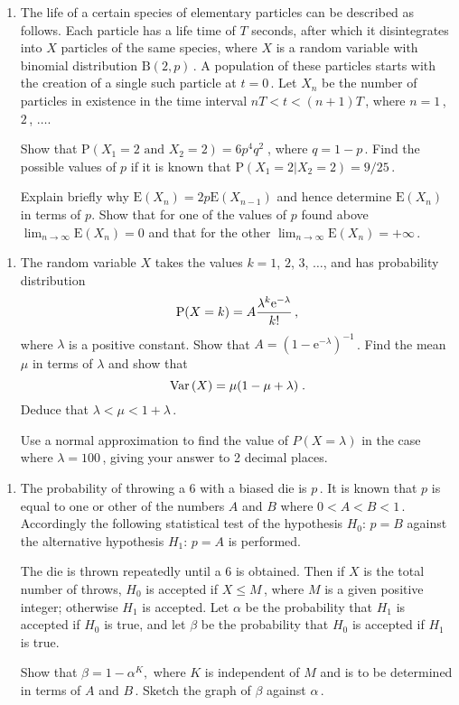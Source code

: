 \documentclass[a4, 11pt]{report}
\newlength{\qspace}
\newcounter{qnumber}
\newenvironment{question}%
 {\vspace{\qspace}
  \begin{enumerate}[\bfseries 1\quad][10]%
    \setcounter{enumi}{\value{qnumber}}%
    \item%
 }
{
  \end{enumerate}
  \filbreak
  \stepcounter{qnumber}
 }
\def\e{{\mathrm e}}
\def\E{{\mathrm E}}
\def\P{{\mathrm P}}
\def\le{\leqslant}
\def\var{{\rm Var}\,}
\begin{document}
\begin{question}
The life of a certain species of elementary particles
can be described as follows. Each particle has a life time 
of $T$ seconds, after which it disintegrates into $X$ particles
of the same species, where $X$ is a random variable with 
binomial distribution $\mathrm{B}(2,p)\,$.
A population of these particles starts with the creation
of a single such particle at $t=0\,$. Let $X_n$ be 
the number of particles in existence in the time interval 
$nT < t < (n+1)T\,$, where $n=1\,$, $2\,$, $\ldots$.  

Show that $\P(X_1=2 \mbox { and } X_2=2) = 6p^4q^2\;$, where $q=1-p\,$.
Find the possible values of $p$ if it is known that 
$\P(X_1=2 \vert X_2=2) =9/25\,$.

Explain briefly why  $\E(X_n) =2p\E(X_{n-1})$ and hence determine $\E(X_n)$
in terms of $p$.
Show that for one of the values of $p$ found above  
$\lim_{n \to \infty}\E(X_n) = 0$ 
and that for the other
$\lim_{n \to \infty}\E(X_n) = + \infty\,$. 
\end{question}

\begin{question}
The random variable $X$ takes the values $k=1$, $2$, $3$, $\dotsc$,
and has probability distribution 
$$
\P(X=k)= A{{{\lambda}^k\e^{-{\lambda}}} \over {k!}}\,,
$$
where $\lambda $ is a positive constant.
Show that $A = (1-\e^{-\lambda})^{-1}\,$. Find
the mean ${\mu}$ in terms of  ${\lambda}$  and show that
$$
\var(X) = {\mu}(1-{\mu}+{\lambda})\;.
$$
Deduce that ${\lambda} < {\mu} < 1+{\lambda}\,$.

Use a normal approximation to find
the value of $P(X={\lambda})$
in the case where ${\lambda}=100\,$, giving your answer to 2 decimal places.
\end{question}

\begin{question}
The probability of throwing a 6 with a biased die
is $p\,$. It is known that  $p$
is equal to one or other of the numbers $A$ and $B$
where  $0< A <B<1 \,$. 
Accordingly the following  statistical 
test of the hypothesis $H_0: \,p=B$ against the alternative
hypothesis $H_1: \,p=A$ is performed.

The die is thrown  repeatedly until a 6 is obtained. Then if
$X$ is the total number of throws,  $H_0$ is accepted if $X \le M\,$,
where $M$ is a given positive integer;  otherwise $H_1$ is accepted.
Let ${\alpha}$ be the probability that $H_1$ is accepted
if $H_0$ is true, and let ${\beta}$ be  the probability that $H_0$
is accepted if $H_1$ is true.  

Show that ${\beta} = 1- {\alpha}^K,$ where $K$ is independent of $M$ and 
is to be determined in terms of 
$A$ and $B\,$.  Sketch the graph of ${\beta}$ 
against ${\alpha}\,$.
\end{question}
	
\end{document}

